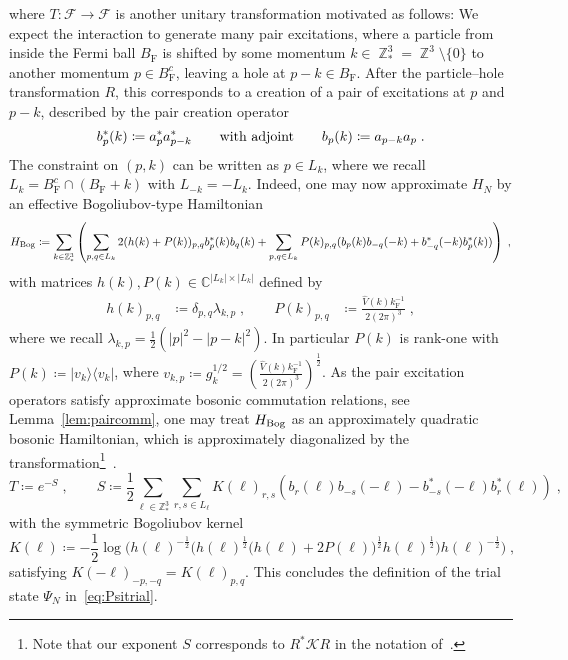\documentclass[12pt,a4paper]{article}
\numberwithin{equation}{section}
\newcommand{\cF}{\mathcal{F}}
\newcommand{\cK}{\mathcal{K}}
\newcommand{\CCC}{\mathbb{C}}
\newcommand{\ZZZ}{\mathbb{Z}}
\newcommand{\1}{\mathbb{I}}
\newcommand{\Bog}{\textnormal{Bog}}
\newcommand{\F}{\mathrm{F}}
\DeclareMathOperator{\Z}{\mathbb{Z}}
\newcommand{\half}{\frac{1}{2}}
\theoremstyle{plain}
\theoremstyle{definition}
\theoremstyle{remark}
\theoremstyle{plain}
\theoremstyle{definition}
\theoremstyle{remark}
\begin{document}
where $ T: \cF \to \cF $ is another unitary transformation motivated as follows: We expect the interaction to generate many pair excitations, where a particle from inside the Fermi ball $ B_{\F} $ is shifted by some momentum $ k \in \Z^3_* = \Z^3 \setminus \{ 0 \} $ to another momentum $ p \in B_{\F}^c $, leaving a hole at $ p-k \in B_{\F} $. After the particle--hole transformation $ R $, this corresponds to a creation of a pair of excitations at $ p $ and $ p-k $, described by the pair creation operator
\begin{equation} \label{eq:b}
	b^*_p(k) \coloneq a_p^* a_{p-k}^* 
	\qquad \textnormal{with adjoint} \qquad
	b_p(k) \coloneq a_{p-k} a_p \;.
\end{equation}
The constraint on $ (p,k) $ can be written as $ p \in L_k $, where we recall $ L_k = B_{\F}^c \cap (B_{\F} + k) $ with $ L_{-k} = - L_k $. Indeed, one may now approximate $ H_N $ by an effective Bogoliubov-type Hamiltonian~\cite[(1.34)]{CHN23}
\begin{equation} \label{eq:HBog}
	H_{\Bog}
	\coloneq \sum_{k \in \ZZZ^3_*} \left( \sum_{p,q \in L_k} 2 (h(k) + P(k))_{p,q} b^*_p(k) b_q(k)
		+ \sum_{p,q \in L_k} P(k)_{p,q} (b_p(k) b_{-q}(-k) + b^*_{-q}(-k) b^*_p(k)) \right) \;,
\end{equation}
with matrices $ h(k), P(k) \in \CCC^{|L_k| \times |L_k|} $ defined by
\begin{equation} \label{eq:HkPk}
\begin{aligned}
	h(k)_{p,q} &\coloneq \delta_{p,q} \lambda_{k,p} \;, \qquad
	P(k)_{p,q} &\coloneq \frac{\hat{V}(k) k_{\F}^{-1}}{2 (2 \pi)^3} \;,
\end{aligned}
\end{equation}
where we recall $ \lambda_{k,p} = \half (|p|^2 - |p-k|^2) $. In particular $ P(k) $ is rank-one with $ P(k) \coloneq |v_k \rangle \langle v_k | $, where $ v_{k,p} \coloneq g_k^{1/2} = \left( \frac{\hat{V}(k) k_{\F}^{-1}}{2 (2 \pi)^3} \right)^\half $. As the pair excitation operators satisfy approximate bosonic commutation relations, see Lemma~\ref{lem:paircomm}, one may treat $ H_{\Bog} $ as an approximately quadratic bosonic Hamiltonian, which is approximately diagonalized by the transformation\footnote{Note that our exponent $ S $ corresponds to $ R^* \cK R $ in the notation of~\cite{CHN23}.}~\cite[Thm.~1.4]{CHN23}.
\begin{equation} \label{eq:T}
	T \coloneq e^{-S} \;, \qquad
	S \coloneq \frac{1}{2}\sum\limits_{\ell\in \mathbb{Z}^3_*}\sum\limits_{r,s\in L_\ell}K(\ell)_{r,s}\left(b_r(\ell)b_{-s}(-\ell)-b^*_{-s}(-\ell)b^*_{r}(\ell)\right) \;,
\end{equation}
with the symmetric Bogoliubov kernel
\begin{equation} \label{eq:K}
	K(\ell) \coloneq - \half \log \Big( h(\ell)^{-\half}
		\big( h(\ell)^{\half} \big( h(\ell) + 2 P(\ell) \big)^{\half} h(\ell)^{\half}\big)
		h(\ell)^{-\half} \Big) \;,
\end{equation}
satisfying $ K(-\ell)_{-p,-q} = K(\ell)_{p,q} $. This concludes the definition of the trial state $ \Psi_N $ in~\eqref{eq:Psitrial}.
\end{document}
